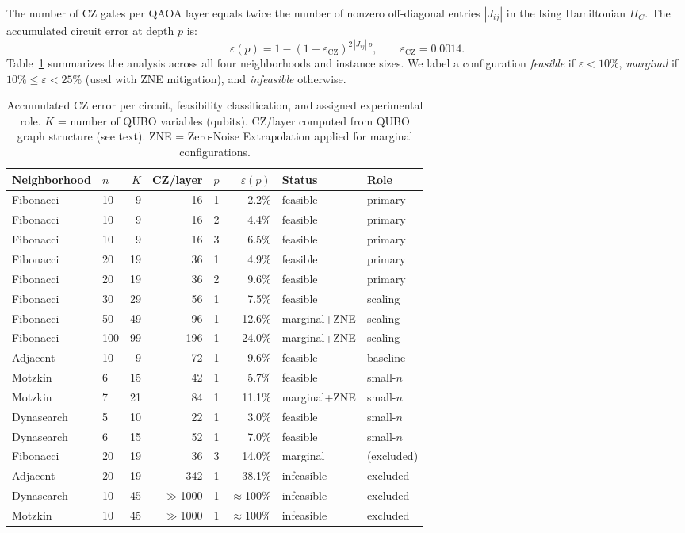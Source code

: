 \documentclass[11pt,a4paper]{article}
\begin{document}
The number of CZ gates per QAOA layer equals twice the number of nonzero
off-diagonal entries $|J_{ij}|$ in the Ising Hamiltonian $H_C$. The
accumulated circuit error at depth $p$ is:
\[
\varepsilon(p) = 1 - (1 - \varepsilon_{\mathrm{CZ}})^{2\,|J_{ij}|\,p},
\qquad \varepsilon_{\mathrm{CZ}} = 0.0014.
\]
Table~\ref{tab:feasibility} summarizes the analysis across all four
neighborhoods and instance sizes. We label a configuration \emph{feasible}
if $\varepsilon < 10\%$, \emph{marginal} if $10\% \le \varepsilon < 25\%$
(used with ZNE mitigation), and \emph{infeasible} otherwise.

\begin{table}[h]
\centering
\caption{Accumulated CZ error per circuit, feasibility classification,
and assigned experimental role. $K$ = number of QUBO variables (qubits).
CZ/layer computed from QUBO graph structure (see text). ZNE = Zero-Noise
Extrapolation applied for marginal configurations.}
\label{tab:feasibility}
\smallskip
\begin{tabular}{@{}llrrrrll@{}}
\toprule
Neighborhood & $n$ & $K$ & CZ/layer & $p$ & $\varepsilon(p)$ &
  Status & Role \\
\midrule
Fibonacci  & 10 & 9  & 16  & 1 &  2.2\% & feasible   & primary \\
Fibonacci  & 10 & 9  & 16  & 2 &  4.4\% & feasible   & primary \\
Fibonacci  & 10 & 9  & 16  & 3 &  6.5\% & feasible   & primary \\
Fibonacci  & 20 & 19 & 36  & 1 &  4.9\% & feasible   & primary \\
Fibonacci  & 20 & 19 & 36  & 2 &  9.6\% & feasible   & primary \\
Fibonacci  & 30 & 29 & 56  & 1 &  7.5\% & feasible   & scaling \\
Fibonacci  & 50 & 49 & 96  & 1 & 12.6\% & marginal+ZNE & scaling \\
Fibonacci  & 100& 99 & 196 & 1 & 24.0\% & marginal+ZNE & scaling \\
\midrule
Adjacent   & 10 & 9  & 72  & 1 &  9.6\% & feasible   & baseline \\
\midrule
Motzkin    & 6  & 15 & 42  & 1 &  5.7\% & feasible   & small-$n$ \\
Motzkin    & 7  & 21 & 84  & 1 & 11.1\% & marginal+ZNE & small-$n$ \\
\midrule
Dynasearch & 5  & 10 & 22  & 1 &  3.0\% & feasible   & small-$n$ \\
Dynasearch & 6  & 15 & 52  & 1 &  7.0\% & feasible   & small-$n$ \\
\midrule
Fibonacci  & 20 & 19 & 36  & 3 & 14.0\% & marginal   & (excluded) \\
Adjacent   & 20 & 19 & 342 & 1 & 38.1\% & infeasible & excluded \\
Dynasearch & 10 & 45 & $\gg$1000 & 1 & $\approx$100\% & infeasible & excluded \\
Motzkin    & 10 & 45 & $\gg$1000 & 1 & $\approx$100\% & infeasible & excluded \\
\bottomrule
\end{tabular}
\end{table}
\end{document}
